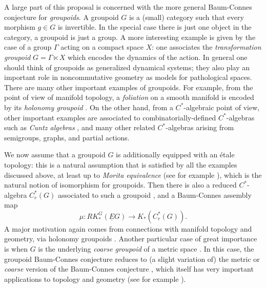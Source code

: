\documentclass[11pt]{article}
\theoremstyle{plain}
\theoremstyle{definition}
\theoremstyle{remark}
\begin{document}
A large part of this proposal is concerned with the more general Baum-Connes conjecture for \emph{groupoids}.  A groupoid $G$ is a (small) category such that every morphism $g\in G$ is invertible.  In the special case there is just one object in the category, a groupoid is just a group.  A more interesting example is given by the case of a group $\Gamma$ acting on a compact space $X$: one associates the \emph{transformation groupoid} $G=\Gamma\ltimes X$ which encodes the dynamics of the action.  In general one should think of groupoids as generalized dynamical systems; they also play an important role in noncommutative geometry as models for pathological spaces.   There are many other important examples of groupoids.  For example, from the point of view of manifold topology, a \emph{foliation} on a smooth manifold is encoded by its \emph{holonomy groupoid} \cite{Connes:1982ss}.  On the other hand, from a $C^*$-algebraic point of view, other important examples are associated to combinatorially-defined $C^*$-algebras such as \emph{Cuntz algebras} \cite{Renault:1980fk}, and many other related $C^*$-algebras arising from semigroups, graphs, and partial actions.  


We now assume that a groupoid $G$ is additionally equipped with an \'{e}tale topology: this is a natural assumption that is satisfied by all the examples discussed above, at least up to \emph{Morita equivalence} (see for example \cite{Sims:2012fk}), which is the natural notion of isomorphism for groupoids.   Then there is also a reduced $C^*$-algebra $C^*_r(G)$ associated to such a groupoid \cite{Renault:2009zr}, and a Baum-Connes assembly map \cite{Tu:1999qm} 
$$
\mu:RK_*^G(\underline{E}G)\to K_*(C^*_r(G)).
$$
A major motivation again comes from connections with manifold topology and geometry, via holonomy groupoids \cite{Baum:2000ez,Connes:1982ss}.  Another particular case of great importance is when $G$ is the underlying \emph{coarse groupoid} of a metric space \cite{Skandalis:2002ng}.  In this case, the groupoid Baum-Connes conjecture reduces to (a slight variation of) the metric or \emph{coarse} version of the Baum-Connes conjecture \cite{Higson:1995fv}, which itself has very important applications to topology and geometry (see for example \cite{Yu:200ve}).  
\end{document}
